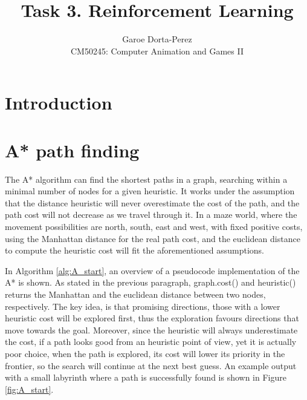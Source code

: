 \documentclass[12pt]{article}
\begin{document}
  
\title{Task 3. Reinforcement Learning}
\author{Garoe Dorta-Perez\\
CM50245: Computer Animation and Games II}
 
\maketitle
 
\section{Introduction}

\section{A* path finding}

The A*\cite{Hart1968} algorithm can find the shortest paths in a graph, searching within a minimal number of nodes for a given heuristic.
It works under the assumption that the distance heuristic will never overestimate the cost of the path, and the path cost will not decrease as we travel through it.
In a maze world, where the movement possibilities are north, south, east and west, with fixed positive costs, using the Manhattan distance for the real path cost, and the euclidean distance to compute the heuristic cost will fit the aforementioned assumptions.

In Algorithm \ref{alg:A_start}, an overview of a pseudocode implementation of the A* is shown.
As stated in the previous paragraph, graph.cost() and heuristic() returns the Manhattan and the euclidean distance between two nodes, respectively. 
The key idea, is that promising directions, those with a lower heuristic cost will be explored first, thus the exploration favours directions that move towards the goal.
Moreover, since the heuristic will always underestimate the cost, if a path looks good from an heuristic point of view, yet it is actually poor choice, when the path is explored, its cost will lower its priority in the frontier, so the search will continue at the next best guess.
An example output with a small labyrinth where a path is successfully found is shown in Figure \ref{fig:A_start}.
\end{document}

